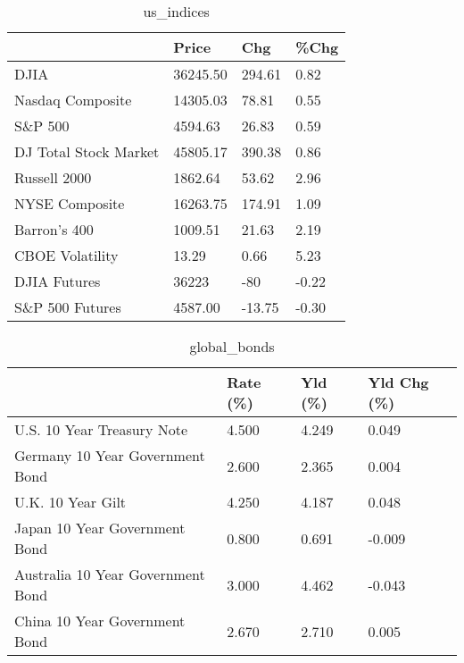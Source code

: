 \documentclass{article}%
\begin{document}
%


\begin{table}[htbp]%
\caption{us\_indices}%
\centering%
\begin{adjustbox}{width=1\textwidth}%
\begin{tabular}{llll}
\toprule
                      &    Price &    Chg &  \%Chg \\
\midrule
                 DJIA & 36245.50 & 294.61 &  0.82 \\
     Nasdaq Composite & 14305.03 &  78.81 &  0.55 \\
              S\&P 500 &  4594.63 &  26.83 &  0.59 \\
DJ Total Stock Market & 45805.17 & 390.38 &  0.86 \\
         Russell 2000 &  1862.64 &  53.62 &  2.96 \\
       NYSE Composite & 16263.75 & 174.91 &  1.09 \\
         Barron's 400 &  1009.51 &  21.63 &  2.19 \\
      CBOE Volatility &    13.29 &   0.66 &  5.23 \\
         DJIA Futures &    36223 &    -80 & -0.22 \\
      S\&P 500 Futures &  4587.00 & -13.75 & -0.30 \\
\bottomrule
\end{tabular}
%
\end{adjustbox}%
\end{table}

%


\begin{table}[htbp]%
\caption{global\_bonds}%
\centering%
\begin{adjustbox}{width=1\textwidth}%
\begin{tabular}{llll}
\toprule
                                  & Rate (\%) & Yld (\%) & Yld Chg (\%) \\
\midrule
       U.S. 10 Year Treasury Note &    4.500 &   4.249 &       0.049 \\
  Germany 10 Year Government Bond &    2.600 &   2.365 &       0.004 \\
                U.K. 10 Year Gilt &    4.250 &   4.187 &       0.048 \\
    Japan 10 Year Government Bond &    0.800 &   0.691 &      -0.009 \\
Australia 10 Year Government Bond &    3.000 &   4.462 &      -0.043 \\
    China 10 Year Government Bond &    2.670 &   2.710 &       0.005 \\
\bottomrule
\end{tabular}
%
\end{adjustbox}%
\end{table}
\end{document}
